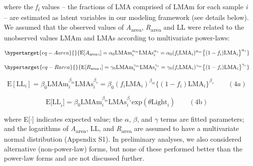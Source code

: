 \documentclass[
  12pt,
  letterpaper,
  DIV=11,
  numbers=noendperiod]{scrartcl}
\begin{document}
where the \emph{f\textsubscript{i}} values -- the fractions of LMA
comprised of LMAm for each sample \emph{i} -- are estimated as latent
variables in our modeling framework (see details below). We assumed that
the observed values of \emph{A}\textsubscript{area},
\emph{R}\textsubscript{area} and LL were related to the unobserved
values LMAm and LMAs according to multivariate power-laws:

\begin{equation}\protect\hypertarget{eq-Aarea}{}{
\mathrm{E}[A_{\mathrm{area} \, i}]
= \alpha_0\mathrm{LMAm}_{i}^{\alpha_m}\mathrm{LMAs}_i^{\alpha_s}  =  \alpha_0 (f_i \mathrm{LMA}_{i})^{\alpha_m} \bigl\{(1-f_i) \mathrm{LMA}_{i}\bigr\}^{\alpha_s}
}\label{eq-Aarea}\end{equation}

\begin{equation}\protect\hypertarget{eq-Rarea}{}{
\mathrm{E}[R_{\mathrm{area} \, i}]
= \gamma_0\mathrm{LMAm}_{i}^{\gamma_m} \mathrm{LMAs}_{i}^{\gamma_s}
= \gamma_0 (f_i \mathrm{LMA}_{i})^{\gamma_m} \bigl\{(1-f_i)\mathrm{LMA}_{i}\bigr\}^{\gamma_s}
}\label{eq-Rarea}\end{equation}

\[
\mathrm{E}[\mathrm{LL}_i] = \beta_0\mathrm{LMAm}_{i}^{\beta_m} \mathrm{LMAs}_{i}^{\beta_s}  = \beta_0 (f_i \mathrm{LMA}_{i})^{\beta_m} \bigl\{(1-f_i) \mathrm{LMA}_{i}\bigr\}^{\beta_s} \qquad(4a)
\]

\[
\mathrm{E[LL}_i] = \beta_0\mathrm{LMAm}_{i}^{\beta_m} \mathrm{LMAs}_{i}^{\beta_s} \mathrm{exp}(\theta \mathrm{Light}_i) \qquad(4\mathrm{b})
\]

where E{[}\(\cdot\){]} indicates expected value; the \(\alpha\),
\(\beta\), and \(\gamma\) terms are fitted parameters; and the
logarithms of \emph{A}\textsubscript{area}, LL, and
\emph{R}\textsubscript{area} are assumed to have a multivariate normal
distribution (Appendix S1). In preliminary analyses, we also considered
alternative (non-power-law) forms, but none of these performed better
than the power-law forms and are not discussed further.
\end{document}
